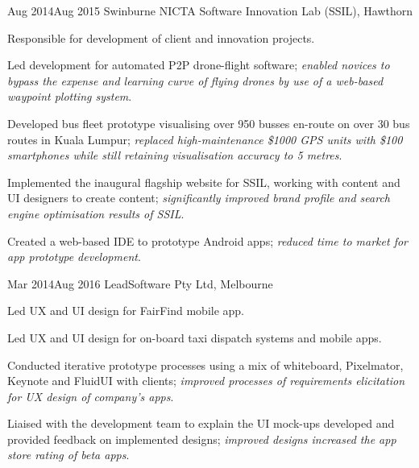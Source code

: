 {Aug 2014}{Aug 2015}
{Swinburne NICTA Software Innovation Lab (SSIL), Hawthorn}
{
  \item Responsible for development of client and innovation projects.
}
{
  \item Led development for automated P2P drone-flight software; \textit{enabled novices to bypass the expense and learning curve of flying drones by use of a web-based waypoint plotting system}.
  \item Developed bus fleet prototype visualising over 950 busses en-route on over 30 bus routes in Kuala Lumpur; \textit{replaced high-maintenance \$1000 GPS units with \$100 smartphones while still retaining visualisation accuracy to 5 metres}.
  \item Implemented the inaugural flagship website for SSIL, working with content and UI designers to create content; \textit{significantly improved brand profile and search engine optimisation results of SSIL}.
  \item Created a web-based IDE to prototype Android apps; \textit{reduced time to market for app prototype development}.
}



{Mar 2014}{Aug 2016}
{LeadSoftware Pty Ltd, Melbourne}
{
  \item Led UX and UI design for FairFind mobile app.
  \item Led UX and UI design for on-board taxi dispatch systems and mobile apps.
}
{
  \item Conducted iterative prototype processes using a mix of whiteboard, Pixelmator, Keynote and FluidUI with clients; \textit{improved processes of requirements elicitation for UX design of company's apps}.
  \item Liaised with the development team to explain the UI mock-ups developed and provided feedback on implemented designs; \textit{improved designs increased the app store rating of beta apps}.
}

\vspace{-2\bigskipamount}